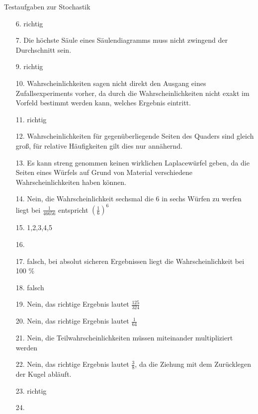 \documentclass[12pt,a4paper]{report}
\begin{document}
	\noindent
	\Large
	Testaufgaben zur Stochastik 
	\large
	\begin{itemize}
		\item[6.] richtig
		\item[7.] Die höchste Säule eines Säulendiagramms muss nicht zwingend der Durchschnitt sein.
		\item[9.] richtig
		\item[10.] Wahrscheinlichkeiten sagen nicht direkt den Ausgang eines Zufallsexperiments vorher, da durch die Wahrscheinlichkeiten nicht exakt im Vorfeld bestimmt werden kann, welches Ergebnis eintritt.
		\item[11.] richtig
		\item[12.] Wahrscheinlichkeiten für gegenüberliegende Seiten des Quaders sind gleich groß, für relative Häufigkeiten gilt dies nur annähernd.
		\item[13.] Es kann streng genommen keinen wirklichen Laplacewürfel geben, da die Seiten eines Würfels auf Grund von Material verschiedene Wahrscheinlichkeiten haben können.
		\item[14.] Nein, die Wahrscheinlichkeit sechsmal die 6 in sechs Würfen zu werfen liegt bei $\frac{1}{46656}$ entspricht $(\frac{1}{6})^6$
		\item[15.] 1,2,3,4,5
		\item[16.] 
		\item[17.] falsch, bei absolut sicheren Ergebnissen liegt die Wahrscheinlichkeit bei 100 \%
		\item[18.] falsch
		\item[19.] Nein, das richtige Ergebnis lautet $\frac{125}{324}$
		\item[20.] Nein, das richtige Ergebnis lautet $\frac{1}{64}$
		\item[21.] Nein, die Teilwahrscheinlichkeiten müssen miteinander multipliziert werden
		\item[22.] Nein, das richtige Ergebnis lautet $\frac{3}{8}$, da die Ziehung mit dem Zurücklegen der Kugel abläuft.
		\item[23.] richtig
		\item[24.] 
	\end{itemize}
\end{document}
